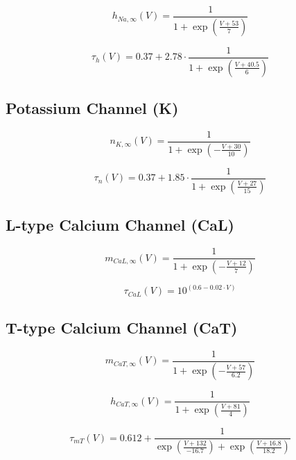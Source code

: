 \documentclass{article}
\begin{document}
\begin{equation}
h_{Na,\infty}(V) = \frac{1}{1 + \exp\left(\frac{V + 53}{7}\right)}
\end{equation}

\begin{equation}
\tau_h(V) = 0.37 + 2.78 \cdot \frac{1}{1 + \exp\left(\frac{V + 40.5}{6}\right)}
\end{equation}

\subsection*{Potassium Channel (K)}
\begin{equation}
n_{K,\infty}(V) = \frac{1}{1 + \exp\left(-\frac{V + 30}{10}\right)}
\end{equation}

\begin{equation}
\tau_n(V) = 0.37 + 1.85 \cdot \frac{1}{1 + \exp\left(\frac{V + 27}{15}\right)}
\end{equation}

\subsection*{L-type Calcium Channel (CaL)}
\begin{equation}
m_{CaL,\infty}(V) = \frac{1}{1 + \exp\left(-\frac{V + 12}{7}\right)}
\end{equation}

\begin{equation}
\tau_{CaL}(V) = 10^{(0.6 - 0.02 \cdot V)}
\end{equation}

\subsection*{T-type Calcium Channel (CaT)}
\begin{equation}
m_{CaT,\infty}(V) = \frac{1}{1 + \exp\left(-\frac{V + 57}{6.2}\right)}
\end{equation}

\begin{equation}
h_{CaT,\infty}(V) = \frac{1}{1 + \exp\left(\frac{V + 81}{4}\right)}
\end{equation}

\begin{equation}
\tau_{mT}(V) = 0.612 + \frac{1}{\exp\left(\frac{V + 132}{-16.7}\right) + \exp\left(\frac{V + 16.8}{18.2}\right)}
\end{equation}
\end{document}
